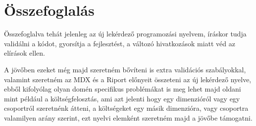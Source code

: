 \chapter{Összefoglalás}\label{sect:Summary}
Összefoglalva tehát jelenleg az új lekérdező programozási nyelvem, íráskor tudja validálni a kódot, gyorsítja a fejlesztést, a változó hivatkozások miatt véd az elírások ellen.

A jövőben ezeket még majd szeretném bővíteni is extra validációs szabályokkal, valamint szeretném az MDX és a Riport előnyeit összeteni az új lekérdező nyelve, ebből kifolyólag olyan domén specifikus problémákat is meg lehet majd oldani mint például a költségfelosztás, ami azt jelenti hogy egy dimenzióról vagy egy csoportról szeretnénk átteni, a költségeket egy másik dimenzióra, vagy csoportra valamilyen arány szerint, ezt nyelvi elemként szeretném majd a jövőbe támogatni.
